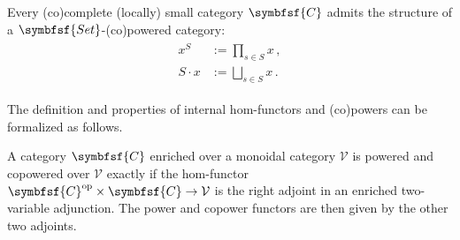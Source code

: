     \begin{example}
        Every (co)complete (locally) small category $\symbfsf{C}$ admits the structure of a $\symbfsf{Set}$-(co)powered category:
        \begin{gather}
            \begin{aligned}
                x^S &:= \prod_{s\in S}x\,,\\
                S\cdot x &:= \bigsqcup_{s\in S}x\,.
            \end{aligned}
        \end{gather}
    \end{example}

    The definition and properties of internal hom-functors and (co)powers can be formalized as follows.
    \begin{property}
        A category $\symbfsf{C}$ enriched over a monoidal category $\mathcal{V}$ is powered and copowered over $\mathcal{V}$ exactly if the hom-functor $\symbfsf{C}^{\text{op}}\times\symbfsf{C}\rightarrow\mathcal{V}$ is the right adjoint in an enriched two-variable adjunction. The power and copower functors are then given by the other two adjoints.
    \end{property}

